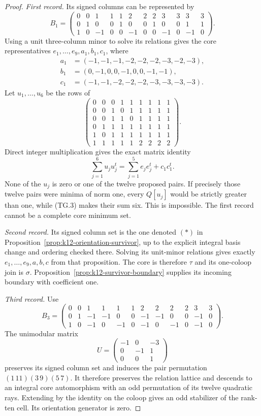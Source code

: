 \documentclass[11pt,a4paper]{article}
\theoremstyle{definition}
\begin{document}
\begin{proof}
\emph{First record.}
Its signed columns can be represented by
\[
B_1=\begin{pmatrix}
0&0&1&1&1&2&2&2&3&3&3&3\\
0&1&0&0&1&0&0&1&0&0&1&1\\
1&0&-1&0&0&-1&0&0&-1&0&-1&0
\end{pmatrix}.
\]
Using a unit three-column minor to solve its relations gives
the core representatives $e_1,\ldots,e_9,a_1,b_1,c_1$, where
\[
\begin{split}
a_1&=(-1,-1,-1,-2,-2,-2,-3,-2,-3),\\
b_1&=(0,-1,0,0,-1,0,0,-1,-1),\\
c_1&=(-1,-1,-2,-2,-2,-3,-3,-3,-3).
\end{split}
\]
Let $u_1,\ldots,u_6$ be the rows of
\[
\begin{pmatrix}
0&0&0&1&1&1&1&1&1\\
0&0&1&0&1&1&1&1&1\\
0&0&1&1&0&1&1&1&1\\
0&1&1&1&1&1&1&1&1\\
1&0&1&1&1&1&1&1&1\\
1&1&1&1&1&2&2&2&2
\end{pmatrix}.
\]
Direct integer multiplication gives the exact matrix identity
\[
 \sum_{j=1}^6u_ju_j^t
     =\sum_{j=1}^5e_je_j^t+c_1c_1^t.                   \tag{TG.3}
\]
None of the $u_j$ is zero or one of the twelve proposed pairs.
If precisely those twelve pairs were minima of norm one,
every $Q[u_j]$ would be strictly greater than one, while
(TG.3) makes their sum six. This is impossible. The first
record cannot be a complete core minimum set.

\emph{Second record.}
Its signed column set is the one denoted $(*)$ in
Proposition~\ref{prop:k12-orientation-survivor}, up to the
explicit integral basis change and ordering checked there.
Solving its unit-minor relations gives exactly
$e_1,\ldots,e_9,a,b,c$ from that proposition. The core is
therefore $\tau$ and its one-coloop join is $\sigma$.
Proposition~\ref{prop:k12-survivor-boundary} supplies its
incoming boundary with coefficient one.

\emph{Third record.}
Use
\[
B_3=\begin{pmatrix}
0&0&1&1&1&1&2&2&2&2&3&3\\
0&1&-1&-1&0&0&-1&-1&0&0&-1&0\\
1&0&-1&0&-1&0&-1&0&-1&0&-1&0
\end{pmatrix}.
\]
The unimodular matrix
\[
 U=\begin{pmatrix}-1&0&-3\\0&-1&1\\0&0&1\end{pmatrix}
\]
preserves its signed column set and induces the pair permutation
$(1\,11)(3\,9)(5\,7)$. It therefore preserves the relation
lattice and descends to an integral core automorphism with
an odd permutation of its twelve quadratic rays. Extending
by the identity on the coloop gives an odd stabilizer of
the rank-ten cell. Its orientation generator is zero.


\end{proof}
\end{document}
